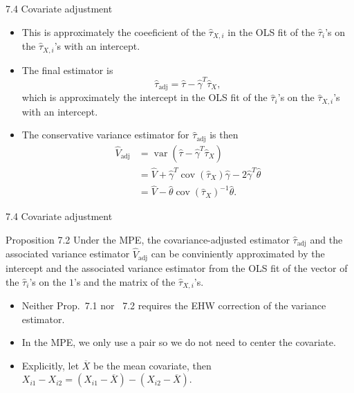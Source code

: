 \documentclass[aspectratio=169, 12pt]{beamer}
\begin{document}
\begin{frame}{7.4 Covariate adjustment}
    \begin{itemize}
        \item This is approximately the coeeficient of the $\hat{\tau}_{X,i}$ in the OLS fit of the $\hat{\tau}_i$'s on the $\hat{\tau}_{X,i}$'s with an intercept.
        \item The final estimator is
        \[
        \hat{\tau}_{\text{adj}} = \hat{\tau}-\hat{\gamma}^T\hat{\tau}_X,
        \]
        which is approximately the intercept in the OLS fit of the $\hat{\tau}_i$'s on the $\hat{\tau}_{X,i}$'s with an intercept.
        \item The conservative variance estimator for $\hat{\tau}_{\text{adj}}$ is then
        \begin{align*}
            \widehat{V}_{\text{adj}}
            &= \operatorname{var}(\hat{\tau}-\hat{\gamma}^T\hat{\tau}_X)\\
            &= \widehat{V} + \hat{\gamma}^T\operatorname{cov}(\hat{\tau}_X)\hat{\gamma} - 2\hat{\gamma}^T\hat{\theta}\\
            &= \widehat{V} - \hat{\theta}\operatorname{cov}(\hat{\tau}_X)^{-1}\hat{\theta}.
        \end{align*}
    \end{itemize}
\end{frame}

\begin{frame}{7.4 Covariate adjustment}
    \begin{keybox}{Proposition 7.2}
        Under the MPE, the covariance-adjusted estimator $\hat{\tau}_{\text{adj}}$ and the associated variance estimator $\widehat{V}_{\text{adj}}$ can be conviniently approximated by the intercept and the associated variance estimator from the OLS fit of the vector of the $\hat{\tau}_i$'s on the $1$'s and the matrix of the $\hat{\tau}_{X,i}$'s.
    \end{keybox}
    \begin{itemize}
        \item Neither Prop.~7.1 nor ~7.2 requires the EHW correction of the variance estimator.
        \item In the MPE, we only use a pair so we do not need to center the covariate.
        \item Explicitly, let $\overline{X}$ be the mean covariate, then $X_{i1}-X_{i2}=(X_{i1}-\overline{X})-(X_{i2}-\overline{X})$.
    \end{itemize}
\end{frame}
\end{document}
